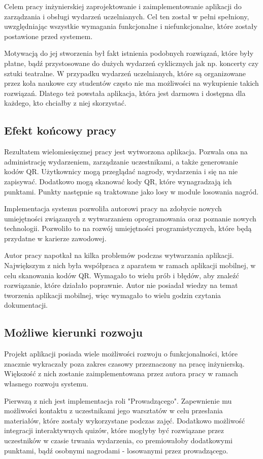 Celem pracy inżynierskiej zaprojektowanie i zaimplementowanie aplikacji do zarządzania i obsługi wydarzeń uczelnianych. Cel ten został w pełni spełniony, uwzględniając wszystkie wymagania funkcjonalne i niefunkcjonalne, które zostały postawione przed systemem.

Motywacją do jej stworzenia był fakt istnienia podobnych rozwiązań, które były płatne, bądź przystosowane do dużych wydarzeń cyklicznych jak np. koncerty czy sztuki teatralne. W przypadku wydarzeń uczelnianych, które są organizowane przez koła naukowe czy studentów często nie ma możliwości na wykupienie takich rozwiązań. Dlatego też powstała aplikacja, która jest darmowa i dostępna dla każdego, kto chciałby z niej skorzystać.
\subsection {Efekt końcowy pracy}
Rezultatem wielomiesięcznej pracy jest wytworzona aplikacja. Pozwala ona na administrację wydarzeniem, zarządzanie uczestnikami, a także generowanie kodów QR. Użytkownicy mogą przeglądać nagrody, wydarzenia i się na nie zapisywać. Dodatkowo mogą skanować kody QR, które wynagradzają ich punktami. Punkty następnie  są traktowane jako losy w module losowania nagród.

Implementacja systemu pozwoliła autorowi pracy na zdobycie nowych umiejętności związanych z wytwarzaniem oprogramowania oraz poznanie nowych technologii. Pozwoliło to na rozwój umiejętności programistycznych, które będą przydatne w karierze zawodowej.

Autor pracy napotkał na kilka problemów podczas wytwarzania aplikacji. Największym z nich była współpraca z aparatem w ramach aplikacji mobilnej, w celu skanowania kodów QR. Wymagało to wielu prób i błędów, aby znaleźć rozwiązanie, które działało poprawnie. Autor nie posiadał wiedzy na temat tworzenia aplikacji mobilnej, więc wymagało to wielu godzin czytania dokumentacji.
\subsection {Możliwe kierunki rozwoju}
Projekt aplikacji posiada wiele możliwości rozwoju o funkcjonalności, które znacznie wykraczały poza zakres czasowy przeznaczony na pracę inżynierską. Większość z nich zostanie zaimplementowana przez autora pracy w ramach własnego rozwoju systemu.

Pierwszą z nich jest implementacja roli "Prowadzącego". Zapewnienie mu możliwości kontaktu z uczestnikami jego warsztatów w celu przesłania materiałów, które zostały wykorzystane podczas zajęć. Dodatkowo możliwość integracji interaktywnych quizów, które mogłyby być rozwiązane przez uczestników w czasie trwania wydarzenia, co premiowałoby dodatkowymi punktami, bądź osobnymi nagrodami - losowanymi przez prowadzącego.

